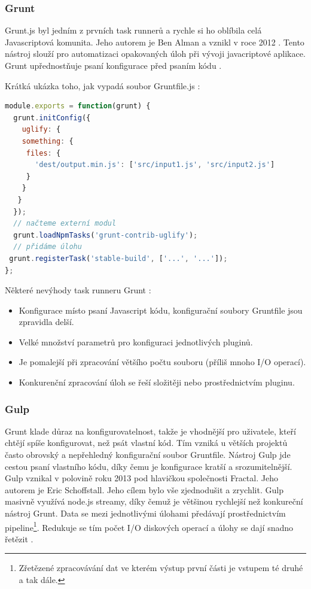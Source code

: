\subsubsection{Grunt}
Grunt.js byl jedním z prvních task runnerů a rychle si ho oblíbila celá Javascriptová komunita. Jeho autorem je Ben Alman a vznikl v roce 2012 \cite{grunt_intro}. Tento nástroj slouží pro automatizaci opakovaných úloh při vývoji javacriptové aplikace. Grunt upřednostňuje psaní konfigurace před psaním kódu \cite{grunt}. 

\pagebreak
\noindent Krátká ukázka toho, jak vypadá soubor Gruntfile.js \cite{grunt} \cite{zdrojak_gulp}:
\begin{lstlisting}[language=Javascript,caption={Ukázka syntaxe souboru Gruntfile.js}]
module.exports = function(grunt) {
  grunt.initConfig({
    uglify: {
    something: {
     files: {
       'dest/output.min.js': ['src/input1.js', 'src/input2.js']
     }
    }
   }
  });
  // načteme externí modul
  grunt.loadNpmTasks('grunt-contrib-uglify');
  // přidáme úlohu
 grunt.registerTask('stable-build', ['...', '...']);
};
\end{lstlisting}
\noindent Některé nevýhody task runneru Grunt \cite{zdrojak_gulp}:
\begin{itemize}
\item Konfigurace místo psaní Javascript kódu, konfigurační soubory Gruntfile jsou zpravidla delší.
\item Velké množství parametrů pro konfiguraci jednotlivých pluginů.
\item Je pomalejší při zpracování většího počtu souboru (příliš mnoho I/O operací).
\item Konkurenční zpracování úloh se řeší složitěji nebo prostřednictvím pluginu.
\end{itemize}

\subsubsection{Gulp}
Grunt klade důraz na konfigurovatelnost, takže je vhodnější pro uživatele, kteří chtějí spíše konfigurovat, než psát vlastní kód. Tím vzniká u větších projektů často obrovský a nepřehledný konfigurační soubor Gruntfile. Nástroj Gulp jde cestou psaní vlastního kódu, díky čemu je konfigurace kratší a srozumitelnější. Gulp vznikal v polovině roku 2013 pod hlavičkou společnosti Fractal. Jeho autorem je Eric Schoffstall. Jeho cílem bylo vše zjednodušit a zrychlit. Gulp masivně využívá node.js streamy, díky čemuž je většinou rychlejší než konkureční nástroj Grunt. Data se mezi jednotlivými úlohami předávají prostřednictvím pipeline\footnote{Zřetězené zpracovávání dat ve kterém výstup první části je vstupem té druhé a tak dále.}. Redukuje se tím počet I/O diskových operací a úlohy se dají snadno řetězit \cite{gulp} \cite{gulp_web} \cite{zdrojak_gulp}.

